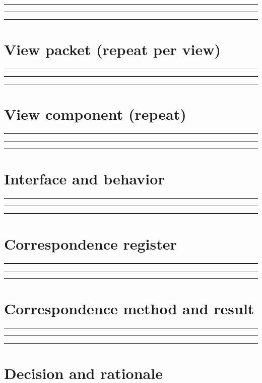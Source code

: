 \documentclass[11pt,letterpaper]{article}
\newcommand{\docsection}[1]{\Needspace{5\baselineskip}\section{#1}}
\begin{document}
\noindent\rule{\linewidth}{0.35pt}\par\vspace{0.7em}
\noindent\rule{\linewidth}{0.35pt}\par\vspace{0.7em}
\noindent\rule{\linewidth}{0.35pt}\par\vspace{0.7em}
\docsection{View packet (repeat per view)}
\noindent\rule{\linewidth}{0.35pt}\par\vspace{0.7em}
\noindent\rule{\linewidth}{0.35pt}\par\vspace{0.7em}
\noindent\rule{\linewidth}{0.35pt}\par\vspace{0.7em}
\docsection{View component (repeat)}
\noindent\rule{\linewidth}{0.35pt}\par\vspace{0.7em}
\noindent\rule{\linewidth}{0.35pt}\par\vspace{0.7em}
\noindent\rule{\linewidth}{0.35pt}\par\vspace{0.7em}
\docsection{Interface and behavior}
\noindent\rule{\linewidth}{0.35pt}\par\vspace{0.7em}
\noindent\rule{\linewidth}{0.35pt}\par\vspace{0.7em}
\noindent\rule{\linewidth}{0.35pt}\par\vspace{0.7em}
\docsection{Correspondence register}
\noindent\rule{\linewidth}{0.35pt}\par\vspace{0.7em}
\noindent\rule{\linewidth}{0.35pt}\par\vspace{0.7em}
\noindent\rule{\linewidth}{0.35pt}\par\vspace{0.7em}
\docsection{Correspondence method and result}
\noindent\rule{\linewidth}{0.35pt}\par\vspace{0.7em}
\noindent\rule{\linewidth}{0.35pt}\par\vspace{0.7em}
\noindent\rule{\linewidth}{0.35pt}\par\vspace{0.7em}
\docsection{Decision and rationale}
\end{document}

